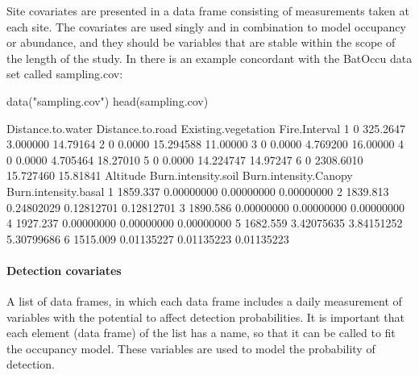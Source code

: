 \documentclass[article]{jss}
\begin{document}
Site covariates are presented in a data frame consisting of measurements
taken at each site. The covariates are used singly and in combination to
model occupancy or abundance, and they should be variables that are
stable within the scope of the length of the study. In
 there is an example concordant with the BatOccu
data set called sampling.cov:

\begin{CodeChunk}
\begin{CodeInput}
data("sampling.cov")
head(sampling.cov)
\end{CodeInput}
\end{CodeChunk}

\begin{CodeChunk}
\begin{CodeOutput}
  Distance.to.water Distance.to.road Existing.vegetation Fire.Interval
1                 0         325.2647            3.000000      14.79164
2                 0           0.0000           15.294588      11.00000
3                 0           0.0000            4.769200      16.00000
4                 0           0.0000            4.705464      18.27010
5                 0           0.0000           14.224747      14.97247
6                 0        2308.6010           15.727460      15.81841
  Altitude Burn.intensity.soil Burn.intensity.Canopy Burn.intensity.basal
1 1859.337          0.00000000            0.00000000           0.00000000
2 1839.813          0.24802029            0.12812701           0.12812701
3 1890.586          0.00000000            0.00000000           0.00000000
4 1927.237          0.00000000            0.00000000           0.00000000
5 1682.559          3.42075635            3.84151252           5.30799686
6 1515.009          0.01135227            0.01135223           0.01135223
\end{CodeOutput}
\end{CodeChunk}

\paragraph{Detection covariates}\label{detection-covariates}

A list of data frames, in which each data frame includes a daily
measurement of variables with the potential to affect detection
probabilities. It is important that each element (data frame) of the
list has a name, so that it can be called to fit the occupancy model.
These variables are used to model the probability of detection.
\end{document}
